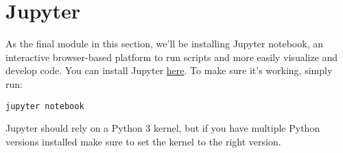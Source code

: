 \documentclass{article}
\begin{document}
\section{Jupyter}
As the final module in this section, we'll be installing Jupyter notebook, an interactive browser-based platform to run scripts and more easily visualize and develop code. You can install Jupyter \href{https://jupyter.org/}{here}. To make sure it's working, simply run:

 \begin{lstlisting}[escapechar=|]
 jupyter notebook
\end{lstlisting}

Jupyter should rely on a Python 3 kernel, but if you have multiple Python versions installed make sure to set the kernel to the right version. 
\end{document}

